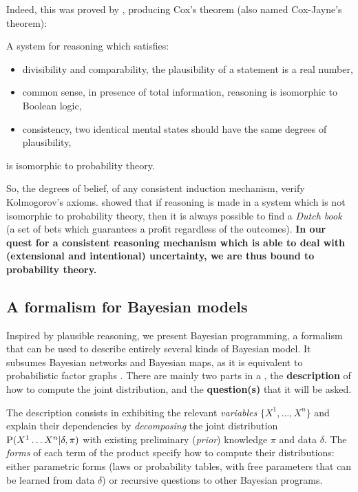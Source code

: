 Indeed, this was proved by \cite{Cox46}, producing Cox's theorem (also named Cox-Jayne's theorem):
\begin{mythm}
A system for reasoning which satisfies:
\begin{itemize}
    \item divisibility and comparability, the plausibility of a statement is a real number,
    \item common sense, in presence of total information, reasoning is isomorphic to Boolean logic,
    \item consistency, two identical mental states should have the same degrees of plausibility,
\end{itemize}
is isomorphic to probability theory.
\end{mythm}
So, the degrees of belief, of any consistent induction mechanism, verify Kolmogorov's axioms. \cite{DeFinetti37} showed that if reasoning is made in a system which is not isomorphic to probability theory, then it is always possible to find a \textit{Dutch book} (a set of bets which guarantees a profit regardless of the outcomes). \textbf{In our quest for a consistent reasoning mechanism which is able to deal with (extensional and intentional) uncertainty, we are thus bound to probability theory.} %


\subsection{A formalism for Bayesian models}
Inspired by plausible reasoning, we present Bayesian programming, a formalism that can be used to describe entirely several kinds of Bayesian model. It subsumes Bayesian networks and Bayesian maps, as it is equivalent to probabilistic factor graphs \citep{Diard03}. There are mainly two parts in a , the \textbf{description} of how to compute the joint distribution, and the \textbf{question(s)} that it will be asked. 

The description consists in exhibiting the relevant \textit{variables} $\{X^1,\dots,X^n\}$ and explain their dependencies by \textit{decomposing} the joint distribution $\mathrm{P}(X^1\dots X^n | \delta, \pi)$ with existing preliminary (\textit{prior}) knowledge $\pi$ and data $\delta$. The \textit{forms} of each term of the product specify how to compute their distributions: either parametric forms (laws or probability tables, with free parameters that can be learned from data $\delta$) or recursive questions to other Bayesian programs.

